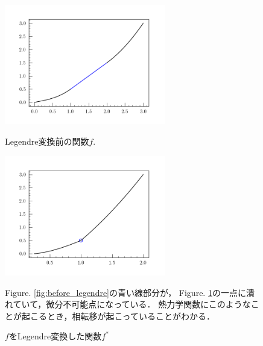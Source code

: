 	\begin{figure}[tb]
		\centering
		\begin{minipage}{0.45\linewidth}
				\centering
				\includegraphics[width=7cm]{./doc/img/eg1_legendre.png}
				\caption{Legendre変換前の関数$f$.}
				\label{fig:before_legendre}
		\end{minipage}
		\begin{minipage}{0.45\linewidth}
				\centering
				\includegraphics[width=7cm]{./doc/img/eg2_legendre.png}
				\caption{$f$をLegendre変換した関数$f^{*}$}
				\label{fig:after_legendre}
		\end{minipage}

Figure. \ref{fig:before_legendre}の青い線部分が，
Figure. \ref{fig:after_legendre}の一点に潰れていて，微分不可能点になっている．
熱力学関数にこのようなことが起こるとき，相転移が起こっていることがわかる．
\end{figure}
